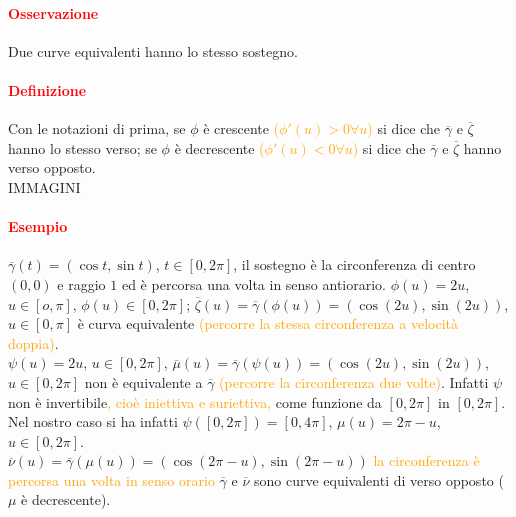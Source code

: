 \documentclass{article}
\begin{document}
\paragraph{\textcolor{red}{Osservazione}}
Due curve equivalenti hanno lo stesso sostegno.

\paragraph{\textcolor{red}{Definizione}}
Con le notazioni di prima, se $\phi$ è crescente \textcolor{orange}{($\phi'(u)>0 \forall u$)} si dice che $\overline{\gamma}$ e $\overline{\zeta}$ hanno lo stesso verso; se $\phi$ è decrescente \textcolor{orange}{($\phi'(u)<0 \forall u $)} si dice che $\overline{\gamma}$ e $\overline{\zeta}$ hanno verso opposto.\\
IMMAGINI

\paragraph{\textcolor{red}{Esempio}}
$\overline{\gamma}(t)=(\cos t, \sin t)$, $t\in [0,2\pi]$, il sostegno è la circonferenza di centro $(0,0)$ e raggio $1$ ed è percorsa una volta  in senso antiorario. $\phi(u)=2u$, $u\in [o,\pi]$, $\phi(u)\in[0,2\pi]$; $\overline{\zeta}(u)=\overline{\gamma}(\phi(u))=(\cos (2u),\sin (2u))$, $u \in [0,\pi]$ è curva equivalente \textcolor{orange}{(percorre la stessa circonferenza a velocità doppia)}.\\
$\psi(u)=2u$, $u \in [0, 2\pi]$, $\overline{\mu}(u)=\overline{\gamma}(\psi(u))=(\cos(2u), \sin (2u))$, $u \in [0,2\pi]$ non è equivalente a $\overline{\gamma}$ \textcolor{orange}{(percorre la circonferenza due volte)}. Infatti $\psi$ non è invertibile\textcolor{orange}{, cioè iniettiva e suriettiva,} come funzione da $[0,2\pi]$ in $[0,2\pi]$. Nel nostro caso si ha infatti $\psi ([0,2\pi])=[0,4\pi]$, $\mu (u)=2\pi-u$, $u \in [0,2\pi]$.\\
$\overline{\nu}(u)=\overline{\gamma}(\mu(u))=(\cos(2\pi-u),\sin(2\pi-u))$ \textcolor{orange}{ la circonferenza è percorsa una volta in senso orario} $\overline{\gamma}$ e $\overline{\nu}$ sono curve equivalenti di verso opposto ($\mu$ è decrescente).
\end{document}
